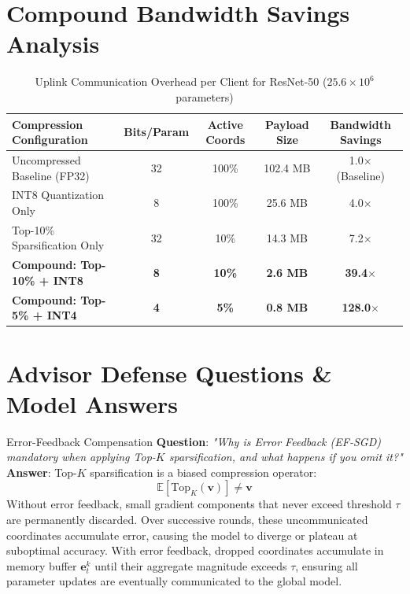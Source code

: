 \documentclass[11pt,a4paper,titlepage]{report}
\begin{document}
\section{Compound Bandwidth Savings Analysis}
\begin{table}[htbp]
    \centering
    \small
    \caption{Uplink Communication Overhead per Client for ResNet-50 ($25.6 \times 10^6$ parameters)}
    \label{tab:bandwidth_comparison}
    \begin{tabular}{@{}lcccc@{}}
        \toprule
        \textbf{Compression Configuration} & \textbf{Bits/Param} & \textbf{Active Coords} & \textbf{Payload Size} & \textbf{Bandwidth Savings} \\
        \midrule
        Uncompressed Baseline (FP32) & 32 & 100\% & 102.4 MB & 1.0$\times$ (Baseline) \\
        INT8 Quantization Only & 8 & 100\% & 25.6 MB & 4.0$\times$ \\
        Top-10\% Sparsification Only & 32 & 10\% & 14.3 MB & 7.2$\times$ \\
        \textbf{Compound: Top-10\% + INT8} & \textbf{8} & \textbf{10\%} & \textbf{2.6 MB} & \textbf{39.4$\times$} \\
        \textbf{Compound: Top-5\% + INT4} & \textbf{4} & \textbf{5\%} & \textbf{0.8 MB} & \textbf{128.0$\times$} \\
        \bottomrule
    \end{tabular}
\end{table}

\section{Advisor Defense Questions \& Model Answers}
\begin{defenseqa}{Error-Feedback Compensation}
\textbf{Question}: \textit{"Why is Error Feedback (EF-SGD) mandatory when applying Top-$K$ sparsification, and what happens if you omit it?"}\\
\textbf{Answer}: Top-$K$ sparsification is a biased compression operator:
\begin{equation}
    \mathbb{E}[\text{Top}_K(\mathbf{v})] \ne \mathbf{v}
\end{equation}
Without error feedback, small gradient components that never exceed threshold $\tau$ are permanently discarded. Over successive rounds, these uncommunicated coordinates accumulate error, causing the model to diverge or plateau at suboptimal accuracy. With error feedback, dropped coordinates accumulate in memory buffer $\mathbf{e}_t^k$ until their aggregate magnitude exceeds $\tau$, ensuring all parameter updates are eventually communicated to the global model.
\end{defenseqa}
\end{document}
